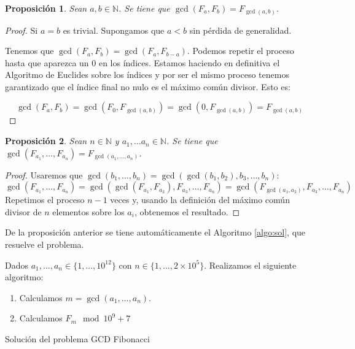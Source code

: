 \documentclass{article}
\theoremstyle{theorem-style}  %
\newtheorem{proposition}{Proposición}
\theoremstyle{definition}
\theoremstyle{example-style}
\begin{document}
    \begin{proposition}
        Sean $a, b \in \mathbb{N}$. Se tiene que $\gcd(F_a, F_b) = F_{\gcd(a, b)}$. 
    \end{proposition}
    \begin{proof}
        Si $a=b$ es trivial. Supongamos que $a < b$ sin pérdida de generalidad. 
        
        Tenemos que $\gcd(F_a, F_b) = \gcd(F_a, F_{b-a})$. Podemos repetir el proceso hasta que aparezca un 0 en los índices. Estamos haciendo en definitiva el Algoritmo de Euclides sobre los índices y por ser el mismo proceso tenemos garantizado que el índice final no nulo es el máximo común divisor. Esto es:

        $$ \gcd(F_a, F_b) = \gcd(F_0, F_{\gcd(a,b)}) = \gcd(0, F_{\gcd(a,b)}) = F_{\gcd(a,b)} $$
    \end{proof}
    
    \begin{proposition}
        Sean $n \in \mathbb{N}$ y $a_1, \dots a_n \in \mathbb{N}$. Se tiene que 
        $\gcd(F_{a_1}, \dots, F_{a_n}) = F_{\gcd(a_1, \dots, a_n)}$. 
    \end{proposition}
    \begin{proof}
        Usaremos que $\gcd(b_1, \dots, b_n) = \gcd( \gcd(b_1, b_2), b_3, \dots, b_n)$:
        $$ \gcd(F_{a_1}, \dots, F_{a_n}) = \gcd(\gcd(F_{a_1},F_{a_2}), F_{a_3}, \dots, F_{a_n}) = \gcd(F_{\gcd(a_1, a_2)}, F_{a_3}, \dots, F_{a_n}) $$
        Repetimos el proceso $n-1$ veces y, usando la definición del máximo común divisor de $n$ elementos sobre los $a_i$, obtenemos el resultado.
    \end{proof}

    De la proposición anterior se tiene automáticamente el Algoritmo \ref{algo:sol}, que resuelve el problema.
    
    \begin{algorithm}
        Dados $a_1, \dots, a_n \in \{1, \dots, 10^{12}\}$ con $n \in \{1, \dots, 2 \times 10^5\}$. Realizamos el siguiente algoritmo:
        \begin{enumerate}
            \item Calculamos $m = \gcd(a_1, \dots, a_n)$.
            \item Calculamos $F_m \mod 10^9+7$
        \end{enumerate}
        \caption{Solución del problema GCD Fibonacci}
        \label{algo:sol}
    \end{algorithm}
\end{document}

